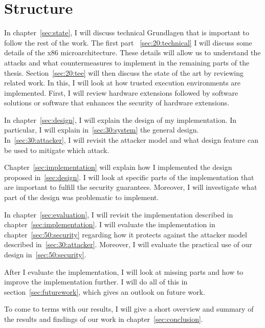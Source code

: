 \section{Structure}
\label{sec:10_structure}
In chapter~\ref{sec:state}, I will discuss technical Grundlagen that is
important to follow the rest of the work. The first part ~\ref{sec:20:technical}
I will discuss some details of the x86 microarchitecture. These details will
allow us to understand the attacks and what countermeasures to implement in the
remaining parts of the thesis. Section~\ref{sec:20:tee} will then discuss the
state of the art by reviewing related work. In this, I will look at how trusted
execution environments are implemented. First, I will review hardware
extensions followed by software solutions or software that enhances the security
of hardware extensions.

In chapter~\ref{sec:design}, I will explain the design of my implementation. In
particular, I will explain in~\ref{sec:30:system} the general design.
In~\ref{sec:30:attacker}, I will revisit the attacker model and what design
feature can be used to mitigate which attack.

Chapter~\ref{sec:implementation} will explain how I implemented the design
proposed in~\ref{sec:design}. I will look at specific parts of the
implementation that are important to fulfill the security guarantees. Moreover,
I will investigate what part of the design was problematic to implement.

In chapter~\ref{sec:evaluation}, I will revisit the implementation described in
chapter~\ref{sec:implementation}. I will evaluate the implementation in
chapter~\ref{sec:50:security} regarding how it protects against the attacker
model described in~\ref{sec:30:attacker}. Moreover, I will evaluate the
practical use of our design in~\ref{sec:50:security}.

After I evaluate the implementation, I will look at missing parts and how to
improve the implementation further. I will do all of this in
section~\ref{sec:futurework}, which gives an outlook on future work.

To come to terms with our results, I will give a short overview and summary of
the results and findings of our work in chapter~\ref{sec:conclusion}.
